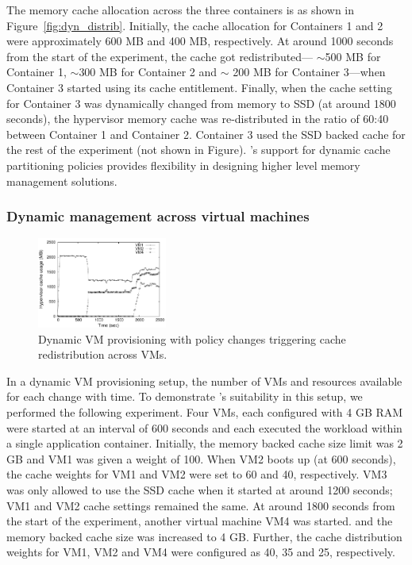 The \dd{} memory cache allocation across the three containers is as shown 
in Figure~\ref{fig:dyn_distrib}.
%
Initially, the cache allocation for Containers 1 and 2 were approximately 
600 MB and 400 MB,
respectively.
%
At around 1000 seconds from the start of the experiment, the \dd{} cache got 
redistributed--- $\sim$500 MB for Container 1, $\sim$300 MB  for Container 2 and
$\sim$ 200 MB for Container 3---when Container 3 started using its cache entitlement.
%
Finally, when the \dd{} cache setting for Container 3 was dynamically changed 
from memory to SSD (at around 1800 seconds), the hypervisor memory 
cache was re-distributed in the ratio of 60:40 between Container 1 and Container 2.
%
Container 3 used the SSD backed \dd{} cache for the rest of the 
experiment (not shown in Figure).
%
\dd's support for dynamic cache partitioning policies provides
flexibility in designing higher level memory management solutions. 

\subsubsection{Dynamic management across virtual machines}
\begin{figure}[t]
  \centering
\includegraphics[width=0.38\textwidth]{data/dynamic_vms/musage}
\vspace{-0.2cm}
 \caption{Dynamic VM provisioning with policy changes triggering \dd{} cache 
          redistribution across VMs.}
\vspace{-0.25cm}
 \label{fig:vm_distrib}
\end{figure} 
In a dynamic VM provisioning setup, the number of VMs and resources
available for each change with time.
%
To demonstrate \dd's suitability in this setup, we performed the
following experiment.
%
Four VMs, each configured with 4 GB RAM were started at an
interval of 600 seconds and
each executed the \video{} workload within 
a single application container. 
%
Initially, the \dd{} memory backed cache size limit was 2 GB and VM1 
was given a weight of 100.
%
When VM2 boots up (at 600 seconds), the \dd{} cache weights 
for VM1 and VM2 were set to 60 and 40, respectively.
%
VM3 was only allowed to use the SSD cache when it started at around 1200 
seconds; VM1 and VM2 cache settings remained the same.
%
At around 1800 seconds from the start of the experiment, another
virtual machine VM4 was started.
and the \dd{} memory backed cache size was increased to 4 GB.
%
Further, the cache distribution weights for VM1, VM2 and VM4 
were configured as 40, 35 and 25, respectively.

